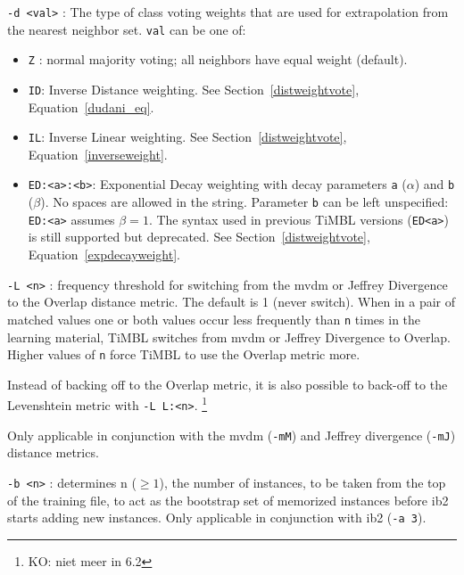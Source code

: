 \documentclass{report}
\begin{document}
\begin{description}
\item {\tt -d <val>} : The type of class voting weights that are used for
extrapolation from the nearest neighbor set. {\tt val} can be one of:
	\begin{itemize} 

  	\item {\tt Z} : normal majority voting; all neighbors have
         equal weight (default).

  	\item {\tt ID}: Inverse Distance weighting. See
  	Section~\ref{distweightvote}, Equation~\ref{dudani_eq}.

  	\item {\tt IL}: Inverse Linear weighting. See
  	Section~\ref{distweightvote}, Equation~\ref{inverseweight}.

  	\item {\tt ED:<a>:<b>}: Exponential Decay weighting with decay
  	parameters {\tt a} ($\alpha$) and {\tt b} ($\beta$). No spaces
  	are allowed in the string. Parameter {\tt b} can be left
  	unspecified: {\tt ED:<a>} assumes $\beta=1$. The syntax used
  	in previous TiMBL versions ({\tt ED<a>}) is still supported
  	but deprecated. See Section~\ref{distweightvote},
  	Equation~\ref{expdecayweight}.

\end{itemize}

\item {\tt -L <n>} : frequency threshold for switching from the {\sc
    mvdm} or Jeffrey Divergence to the Overlap distance metric. The
  default is 1 (never switch). When in a pair of matched values one or
  both values occur less frequently than {\tt n} times in the learning
  material, TiMBL switches from {\sc mvdm} or Jeffrey Divergence to
  Overlap. Higher values of {\tt n} force TiMBL to use the Overlap
  metric more. 

  Instead of backing off to the Overlap metric, it is also possible to
  back-off to the Levenshtein metric with {\tt -L L:<n>}. \footnote{KO: niet meer in 6.2}

  Only applicable in conjunction with the {\sc mvdm}
  ({\tt -mM}) and Jeffrey divergence ({\tt -mJ}) distance metrics.


\item {\tt -b <n>} : determines n ($\geq 1$), the number of instances,
to be taken from the top of the training file, to act as the bootstrap
set of memorized instances before {\sc ib2} starts adding new
instances. Only applicable in conjunction with {\sc ib2} ({\tt -a 3}).


\end{description}
\end{document}
